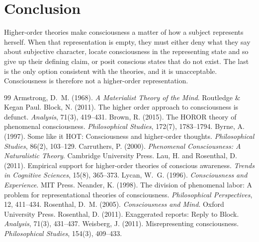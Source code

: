 \documentclass{situationist-preprint}
\begin{document}
\section{Conclusion}

Higher-order theories make consciousness a matter of how a subject represents herself. When that representation is empty, they must either deny what they say about subjective character, locate consciousness in the representing state and so give up their defining claim, or posit conscious states that do not exist. The last is the only option consistent with the theories, and it is unacceptable. Consciousness is therefore not a higher-order representation.

\begin{thebibliography}{99}\small
{} Armstrong, D.~M. (1968). \emph{A Materialist Theory of the Mind}. Routledge \& Kegan Paul.
 Block, N. (2011). The higher order approach to consciousness is defunct. \emph{Analysis}, 71(3), 419--431.
 Brown, R. (2015). The HOROR theory of phenomenal consciousness. \emph{Philosophical Studies}, 172(7), 1783--1794.
 Byrne, A. (1997). Some like it HOT: Consciousness and higher-order thoughts. \emph{Philosophical Studies}, 86(2), 103--129.
 Carruthers, P. (2000). \emph{Phenomenal Consciousness: A Naturalistic Theory}. Cambridge University Press.
 Lau, H. and Rosenthal, D. (2011). Empirical support for higher-order theories of conscious awareness. \emph{Trends in Cognitive Sciences}, 15(8), 365--373.
 Lycan, W.~G. (1996). \emph{Consciousness and Experience}. MIT Press.
 Neander, K. (1998). The division of phenomenal labor: A problem for representational theories of consciousness. \emph{Philosophical Perspectives}, 12, 411--434.
 Rosenthal, D.~M. (2005). \emph{Consciousness and Mind}. Oxford University Press.
 Rosenthal, D. (2011). Exaggerated reports: Reply to Block. \emph{Analysis}, 71(3), 431--437.
 Weisberg, J. (2011). Misrepresenting consciousness. \emph{Philosophical Studies}, 154(3), 409--433.
\end{thebibliography}
\end{document}
